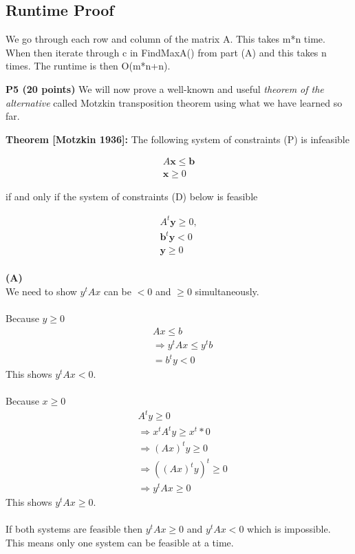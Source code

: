 \documentclass[11pt]{article}
\begin{document}
\subsection*{Runtime Proof}
We go through each row and column of the matrix A.  This takes m*n time.  When then iterate through c in FindMaxA() from part (A) and this takes n times.  The runtime is then O(m*n+n).

\noindent\textbf{P5 (20 points)} We will now prove a well-known
and useful \emph{theorem of the alternative} called Motzkin
transposition theorem using what we have learned so far.

\begin{framed}
\noindent\textbf{Theorem [Motzkin 1936]:} The following system of constraints \textsf{(P)} is infeasible

\[ \begin{array}{l}
A \mathbf{x} \leq \mathbf{b}\\
 \mathbf{x} \geq 0 
\end{array}\]

 if and only if the system of constraints \textsf{(D)}  below is feasible

\[ \begin{array}{l}
A^t \mathbf{y} \geq 0,\\
\mathbf{b}^t \mathbf{y} < 0\\
\mathbf{y} \geq 0 \\
\end{array}\]
\end{framed}

\noindent\textbf{(A)}
\\
We need to show $y^tAx$ can be $<0$ and $\geq 0$ simultaneously.\\
\\
Because $y \geq 0$
\begin{align*}
&Ax \leq b \\
&\Rightarrow y^tAx \leq y^tb \\
&= b^ty < 0
\end{align*}
This shows $y^tAx < 0$.\\
\\
Because $x \geq 0$
\begin{align*}
&A^ty \geq 0 \\
&\Rightarrow x^tA^ty \geq x^t*0\\
&\Rightarrow (Ax)^ty \geq 0 \\
&\Rightarrow ((Ax)^ty)^t \geq 0 \\
&\Rightarrow y^tAx \geq 0
\end{align*}
This shows $y^tAx \geq 0$.\\
\\ 
If both systems are feasible then $y^tAx \geq 0$ and $y^tAx < 0$ which is impossible.  This means only one system can be feasible at a time. 
\medskip
\end{document}
